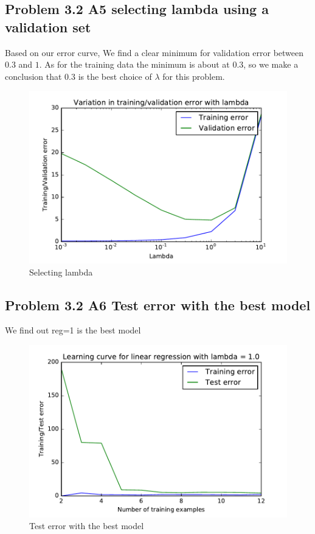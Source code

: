 \documentclass[pdftex,11pt]{article}
\begin{document}
\subsection{Problem 3.2 A5 selecting lambda using a validation set}
Based on our error curve, We find a clear minimum for validation error between $0.3$ and $1$. As for the training data the minimum is about at $0.3$, so we make a conclusion that $0.3$ is the best choice of $\lambda$ for this problem.

\begin{figure}[H]
  \caption{Selecting lambda}
  \centering
    \includegraphics[scale=1]{fig12.pdf}
\end{figure}
\subsection{Problem 3.2 A6 Test error with the best model}
We find out reg=1 is the best model
\begin{figure}[H]
  \caption{Test error with the best model}
  \centering
    \includegraphics[scale=1]{figtest.pdf}
\end{figure}
\end{document}

